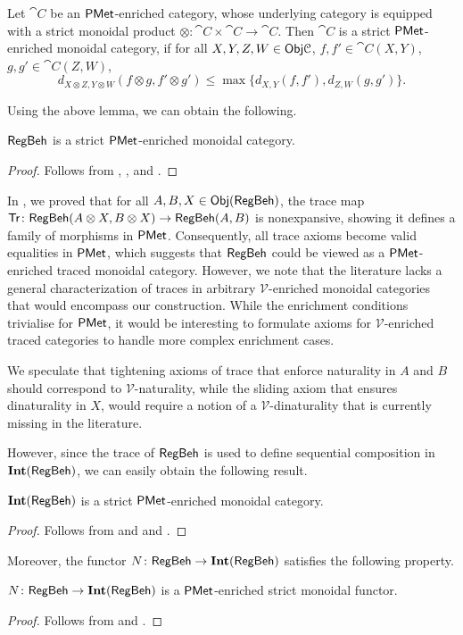 	\begin{lemma}\label{lem:enriched_mon_cat}
		Let $\cat{C}$ be an $\mathsf{PMet}$-enriched category, whose underlying category is equipped with a strict monoidal product $\otimes : \cat{C} \times \cat{C} \to \cat{C}$. Then $\cat{C}$ is a strict $\mathsf{PMet}$-enriched monoidal category, if for all $X,Y,Z,W \in \mathsf{Obj}{\mathcal{C}}$, $f,f' \in \cat{C}(X,Y)$, $g, g' \in \cat{C}(Z,W)$,
		$$
			d_{X \otimes Z, Y \otimes W}(f \otimes g, f' \otimes g') \leq \max\{d_{X,Y}(f,f'), d_{Z,W}(g,g')\}.
		$$
	\end{lemma}
	Using the above lemma, we can obtain the following.
	\begin{corollary}
		$\mathsf{RegBeh}$ is a strict $\mathsf{PMet}$-enriched monoidal category.
	\end{corollary}
	\begin{proof}
		Follows from , ,  and .
	\end{proof}
In , we proved that for all $A,B,X \in \mathsf{Obj}(\mathsf{RegBeh})$, the trace map
$\mathsf{Tr} \colon \mathsf{RegBeh}(A \otimes X, B \otimes X) \to \mathsf{RegBeh}(A,B)$ is nonexpansive,
showing it defines a family of morphisms in $\mathsf{PMet}$.
Consequently, all trace axioms become valid equalities in $\mathsf{PMet}$,
which suggests that $\mathsf{RegBeh}$ could be viewed as a $\mathsf{PMet}$-enriched traced monoidal category. However, we note that the literature lacks a general characterization of traces in arbitrary $\mathcal{V}$-enriched monoidal categories that would encompass our construction. While the enrichment conditions trivialise for $\mathsf{PMet}$, it would be interesting to formulate axioms for $\mathcal{V}$-enriched traced categories to handle more complex enrichment cases.

We speculate that tightening axioms of trace that enforce naturality in $A$ and $B$
should correspond to $\mathcal{V}$-naturality, while the sliding axiom that ensures dinaturality in $X$, would require a notion of a $\mathcal{V}$-dinaturality that is currently missing in the literature. 

However, since the trace of $\mathsf{RegBeh}$ is used to define sequential composition in $\mathbf{Int}(\mathsf{RegBeh})$, we can easily obtain the following result.
\begin{corollary}
	$\mathbf{Int}(\mathsf{RegBeh})$ is a strict $\mathsf{PMet}$-enriched monoidal category.
\end{corollary}
\begin{proof}
	Follows from  and  and .
\end{proof}
Moreover, the functor $N \colon \mathsf{RegBeh} \to \mathbf{Int}(\mathsf{RegBeh})$ satisfies the following property.
\begin{corollary}
	$N \colon \mathsf{RegBeh} \to \mathbf{Int}(\mathsf{RegBeh})$ is a $\mathsf{PMet}$-enriched strict monoidal functor. 
\end{corollary}
\begin{proof}
	Follows from  and .
\end{proof}
